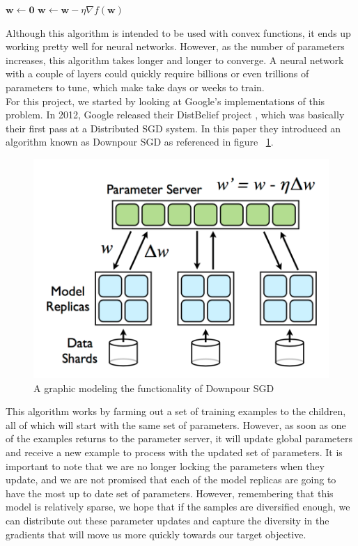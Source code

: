 \documentclass[11pt]{article}
\begin{document}
\begin{algorithmic}
\State $\mathbf w \gets \mathbf 0$
    \State $\mathbf w \gets \mathbf w - \eta\nabla f(\mathbf w)$
	\EndFor
\EndWhile

\end{algorithmic}

\noindent Although this algorithm is intended to be used with convex functions, it ends up working pretty well for neural networks. However, as the number of parameters increases, this algorithm takes longer and longer to converge. A neural network with a couple of layers could quickly require billions or even trillions of parameters to tune, which make take days or weeks to train. \\

\noindent For this project, we started by looking at Google's implementations of this problem. In 2012, Google released their DistBelief project \cite{distbelief}, which was basically their first pass at a Distributed SGD system. In this paper they introduced an algorithm known as Downpour SGD as referenced in figure  ~\ref{fig:downpour}.\\
\begin{figure}[!ht]
  \centering
      \includegraphics[scale = .6]{./images/downpour}
  \caption{A graphic modeling the functionality of Downpour SGD \cite{distbelief}}
  \label{fig:downpour}
\end{figure}

\noindent This algorithm works by farming out a set of training examples to the children, all of which will start with the same set of parameters. However, as soon as one of the examples returns to the parameter server, it will update global parameters and receive a new example to process with the updated set of parameters. It is important to note that we are no longer locking the parameters when they update, and we are not promised that each of the model replicas are going to have the most up to date set of parameters. However, remembering that this model is relatively sparse, we hope that if the samples are diversified enough, we can distribute out these parameter updates and capture the diversity in the gradients that will move us more quickly towards our target objective. \\
\end{document}
